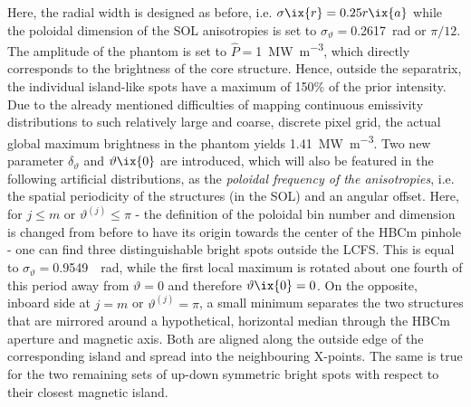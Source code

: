 %
            Here, the radial width is designed as before, i.e. $\sigma\ix{r}=0.25r\ix{a}$ while the poloidal dimension of the SOL anisotropies is set to $\sigma_{\vartheta}=$\SI{0.2617}{\radian} or $\pi/12$. The amplitude of the phantom is set to $\hat{P}=$\SI{1}{\mega\watt\per\cubic\meter}, which directly corresponds to the brightness of the core structure. Hence, outside the separatrix, the individual island-like spots have a maximum of 150\% of the prior intensity. Due to the already mentioned difficulties of mapping continuous emissivity distributions to such relatively large and coarse, discrete pixel grid, the actual global maximum brightness in the phantom yields \SI{1.41}{\mega\watt\per\cubic\meter}. Two new parameter $\delta_{\vartheta}$ and $\vartheta\ix{0}$ are introduced, which will also be featured in the following artificial distributions, as the \textit{poloidal frequency of the anisotropies}, i.e. the spatial periodicity of the structures (in the SOL) and an angular offset. Here, for $j\leq m$ or $\vartheta^{\left(j\right)}\leq\pi$ - the definition of the poloidal bin number and dimension is changed from before to have its origin towards the center of the HBCm pinhole - one can find three distinguishable bright spots outside the LCFS. This is equal to $\sigma_{\vartheta}=$\SI[per-mode=reciprocal]{0.9549}{\per\radian}, while the first local maximum is rotated about one fourth of this period away from $\vartheta=0$ and therefore $\vartheta\ix{0}=0$. On the opposite, inboard side at $j=m$ or $\vartheta^{\left(j\right)}=\pi$, a small minimum separates the two structures that are mirrored around a hypothetical, horizontal median through the HBCm aperture and magnetic axis. Both are aligned along the outside edge of the corresponding island and spread into the neighbouring X-points. The same is true for the two remaining sets of up-down symmetric bright spots with respect to their closest magnetic island.\\%
